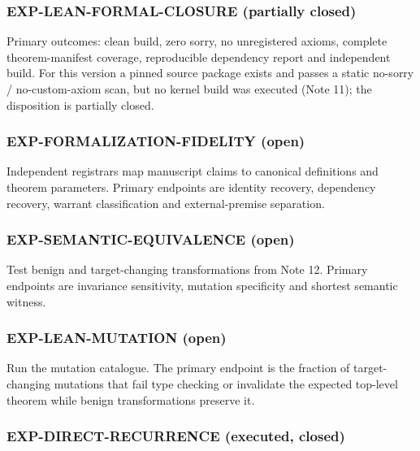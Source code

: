 \hypertarget{exp-lean-formal-closure-partially-closed}{%
\subsubsection{EXP-LEAN-FORMAL-CLOSURE (partially
closed)}\label{exp-lean-formal-closure-partially-closed}}

Primary outcomes: clean build, zero sorry, no unregistered axioms,
complete theorem-manifest coverage, reproducible dependency report and
independent build. For this version a pinned source package exists and
passes a static no-sorry / no-custom-axiom scan, but no kernel build was
executed (Note 11); the disposition is partially closed.

\hypertarget{exp-formalization-fidelity-open}{%
\subsubsection{EXP-FORMALIZATION-FIDELITY
(open)}\label{exp-formalization-fidelity-open}}

Independent registrars map manuscript claims to canonical definitions
and theorem parameters. Primary endpoints are identity recovery,
dependency recovery, warrant classification and external-premise
separation.

\hypertarget{exp-semantic-equivalence-open}{%
\subsubsection{EXP-SEMANTIC-EQUIVALENCE
(open)}\label{exp-semantic-equivalence-open}}

Test benign and target-changing transformations from Note 12. Primary
endpoints are invariance sensitivity, mutation specificity and shortest
semantic witness.

\hypertarget{exp-lean-mutation-open}{%
\subsubsection{EXP-LEAN-MUTATION (open)}\label{exp-lean-mutation-open}}

Run the mutation catalogue. The primary endpoint is the fraction of
target-changing mutations that fail type checking or invalidate the
expected top-level theorem while benign transformations preserve it.

\hypertarget{exp-direct-recurrence-executed-closed}{%
\subsubsection{EXP-DIRECT-RECURRENCE (executed,
closed)}\label{exp-direct-recurrence-executed-closed}}

